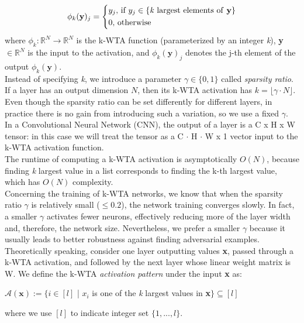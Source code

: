 \documentclass[a4paper]{article}
\begin{document}
	\begin{equation}
	\phi_{k}(\textbf{y})_{j} = 
	\begin{cases*}
	y_{j}\textrm{, if }y_{j} \in\{\textrm{\textit{k} largest elements of \textbf{y}}\} \\
	0 \textrm{, otherwise}
	\end{cases*}
	\end{equation}
	where $\phi_{k}: \mathbb{R}^{N} \rightarrow \mathbb{R}^{N}$ is the k-WTA function (parameterized by an integer \textit{k}), \textbf{y} $\in \mathbb{R}^{N}$ is the input to the activation, and $\phi_{k}(\textbf{y})_{j}$ denotes the j-th element of the output $\phi_{k}(\textbf{y})$.\\
	Instead of specifying \textit{k}, we introduce a parameter $\gamma \in \{0,1\}$ called \emph{sparsity ratio}. If a layer has an output dimension $N$, then its k-WTA activation has  $k = \lfloor\gamma \cdot N\rfloor$. Even though the sparsity ratio can be set differently for different layers, in practice there is no gain from introducing such a variation, so we use a fixed $\gamma$.\\
	In a Convolutional Neural Network (CNN), the output of a layer is a C x H x W tensor: in this case we will treat the tensor as a C $\cdot$ H $\cdot$ W x 1 vector input to the k-WTA activation function.\\
	The runtime of computing a k-WTA activation is asymptotically $O(N)$, because finding \textit{k} largest value in a list corresponds to finding the k-th largest value, which has $O(N)$ complexity.\\
	Concerning the training of k-WTA networks, we know that when the sparsity ratio $\gamma$ is relatively small ($\le 0.2$), the network training converges slowly. In fact, a smaller $\gamma$ activates fewer neurons, effectively reducing more of the layer width and, therefore, the network size. Nevertheless, we prefer a smaller $\gamma$ because it usually leads to better robustness against finding adversarial examples.\\
	Theoretically speaking, consider one layer outputting values \textbf{x}, passed through  a k-WTA activation, and followed by the next layer whose linear weight matrix is
	W. We define the k-WTA \emph{activation pattern} under the input \textbf{x} as:
	\begin{center}
		$\mathcal{A}(\textbf{x}) := \{i \in [l]$ | $x_{i}$ is one of the \textit{k} largest values in \textbf{x}$\} \subseteq [l]$
	\end{center}
	where we use $[l]$ to indicate integer set $\{1,...,l\}$.\\
\end{document}
